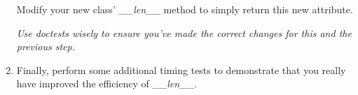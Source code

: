 \documentclass[12pt]{article}
\begin{document}
\begin{enumerate}[1.]
    \bigskip

    Modify your new class’ \textit{\_\_len\_\_} method to simply return this new
    attribute.

    \textit{Use doctests wisely to ensure you’ve made the correct changes for this and the previous step.}

    \item Finally, perform some additional timing tests to demonstrate that you really have
    improved the efficiency of \textit{\_\_len\_\_}.

\end{enumerate}
\end{document}

